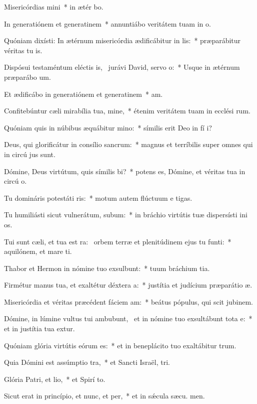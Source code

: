 \item Misericórdias mini~* in ætér bo.
\item In generatiónem et generatinem~* annuntiábo veritátem tuam in  o.
\item Quóniam dixísti: In ætérnum misericórdia ædificábitur in lis:~* præparábitur véritas tu  is.
\item Dispósui testaméntum eléctis is,~\pscross{} jurávi David, servo o:~* Usque in ætérnum præparábo  um.
\item Et ædificábo in generatiónem et generatinem~*  am.
\item Confitebúntur cæli mirabília tua, mine,~* étenim veritátem tuam in ecclési rum.
\item Quóniam quis in núbibus æquábitur mino:~* símilis erit Deo in fí i?
\item Deus, qui glorificátur in consílio sancrum:~* magnus et terríbilis super omnes qui in circú jus sunt.
\item Dómine, Deus virtútum, quis símilis bi?~* potens es, Dómine, et véritas tua in circú o.
\item Tu domináris potestáti ris:~* motum autem flúctuum e  tigas.
\item Tu humiliásti sicut vulnerátum, subum:~* in bráchio virtútis tuæ dispersísti ini os.
\item Tui sunt cæli, et tua est ra:~\pscross{} orbem terræ et plenitúdinem ejus tu funti:~* aquilónem, et mare  ti.
\item Thabor et Hermon in nómine tuo exsulbunt:~* tuum bráchium  tia.
\item Firmétur manus tua, et exaltétur déxtera a:~* justítia et judícium præparátio  æ.
\item Misericórdia et véritas præcédent fáciem am:~* beátus pópulus, qui scit jubinem.
\item Dómine, in lúmine vultus tui ambubunt,~\pscross{} et in nómine tuo exsultábunt tota e:~* et in justítia tua extur.
\item Quóniam glória virtútis eórum  es:~* et in beneplácito tuo exaltábitur  trum.
\item Quia Dómini est assúmptio tra,~* et Sancti Israël,  tri.
\item Glória Patri, et lio,~* et Spirí to.
\item Sicut erat in princípio, et nunc, et per,~* et in sǽcula sæcu. men.
